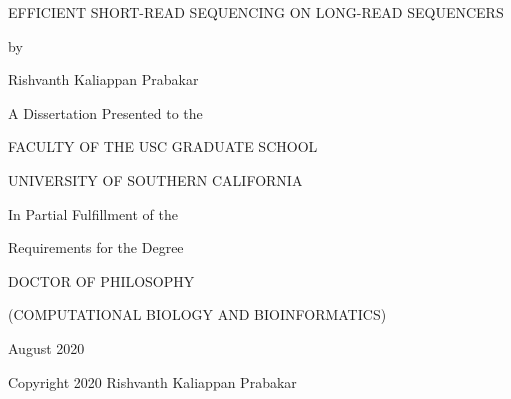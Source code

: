 \documentclass[12pt]{report}
\begin{document}
\begin{titlepage}
\centering
  \vspace*{2cm}
  \MakeUppercase{Efficient short-read sequencing on long-read sequencers}
  \vspace{1cm}
  \par
  by
  \vspace{1cm}
  \par
  {Rishvanth Kaliappan Prabakar}

  \vspace{3cm}
  \par
  A Dissertation Presented to the
  \par
  \MakeUppercase{Faculty of the USC graduate school}
  \par
  \MakeUppercase{University of Southern California}
  \par
  In Partial Fulfillment of the
  \par
  Requirements for the Degree
  \par
  \MakeUppercase{Doctor of Philosophy}
  \par
  \MakeUppercase{(Computational Biology and Bioinformatics)}

  \vspace{3cm}
  August 2020

  \vfill
  \raggedleft
  Copyright 2020
  \hfill
  Rishvanth Kaliappan Prabakar
\end{titlepage}


\doublespacing
{}
\setcounter{page}{2}

{}


\setlength{\epigraphwidth}{1.0\textwidth}
\setlength{\epigraphrule}{0pt}
\vspace*{2in}

\newpage

{}


\singlespacing

\tableofcontents
\listoffigures
\newpage
\end{document}
